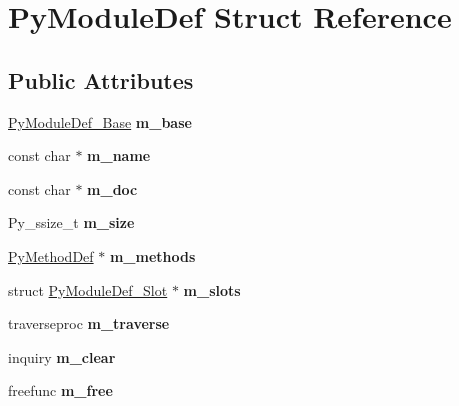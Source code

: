 \hypertarget{structPyModuleDef}{}\section{Py\+Module\+Def Struct Reference}
\label{structPyModuleDef}
\subsection*{Public Attributes}
\begin{DoxyCompactItemize}
\item 
\hyperlink{structPyModuleDef__Base}{Py\+Module\+Def\+\_\+\+Base} {\bfseries m\+\_\+base}\hypertarget{structPyModuleDef_a017d219acf20287393795e7d4b29ab63}{}\label{structPyModuleDef_a017d219acf20287393795e7d4b29ab63}

\item 
const char $\ast$ {\bfseries m\+\_\+name}\hypertarget{structPyModuleDef_aaa4851e8eff2117539c4dab6fa97506e}{}\label{structPyModuleDef_aaa4851e8eff2117539c4dab6fa97506e}

\item 
const char $\ast$ {\bfseries m\+\_\+doc}\hypertarget{structPyModuleDef_a99a9a7746b553b7d404623235ab8e59c}{}\label{structPyModuleDef_a99a9a7746b553b7d404623235ab8e59c}

\item 
Py\+\_\+ssize\+\_\+t {\bfseries m\+\_\+size}\hypertarget{structPyModuleDef_a975ebd7e8c6582bed62d4e0297d6df2d}{}\label{structPyModuleDef_a975ebd7e8c6582bed62d4e0297d6df2d}

\item 
\hyperlink{structPyMethodDef}{Py\+Method\+Def} $\ast$ {\bfseries m\+\_\+methods}\hypertarget{structPyModuleDef_a85c882ff2a40531cab2319a9f93e9b0d}{}\label{structPyModuleDef_a85c882ff2a40531cab2319a9f93e9b0d}

\item 
struct \hyperlink{structPyModuleDef__Slot}{Py\+Module\+Def\+\_\+\+Slot} $\ast$ {\bfseries m\+\_\+slots}\hypertarget{structPyModuleDef_ad1095d072cd3ef6f81a9a06100d804a3}{}\label{structPyModuleDef_ad1095d072cd3ef6f81a9a06100d804a3}

\item 
traverseproc {\bfseries m\+\_\+traverse}\hypertarget{structPyModuleDef_a0922503bf8a1e912dffd61ca95607478}{}\label{structPyModuleDef_a0922503bf8a1e912dffd61ca95607478}

\item 
inquiry {\bfseries m\+\_\+clear}\hypertarget{structPyModuleDef_a33c586c65ce380d0aeb1680798465435}{}\label{structPyModuleDef_a33c586c65ce380d0aeb1680798465435}

\item 
freefunc {\bfseries m\+\_\+free}\hypertarget{structPyModuleDef_a52995b482648e59bdc9bf5ddf543092e}{}\label{structPyModuleDef_a52995b482648e59bdc9bf5ddf543092e}

\end{DoxyCompactItemize}



